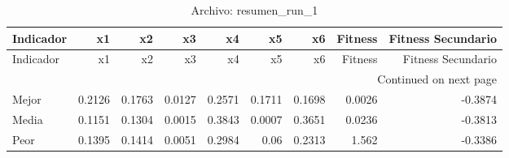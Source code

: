 \begin{longtable}{lrrrrrrrr}
\caption{Archivo: resumen\_run\_1}\label{tab:resumen_run_1} \\
\toprule
Indicador & x1 & x2 & x3 & x4 & x5 & x6 & Fitness & Fitness Secundario \\
\midrule
\endfirsthead
\toprule
Indicador & x1 & x2 & x3 & x4 & x5 & x6 & Fitness & Fitness Secundario \\
\midrule
\endhead
\midrule
\multicolumn{9}{r}{Continued on next page} \\
\midrule
\endfoot
\bottomrule
\endlastfoot
Mejor & 0.2126 & 0.1763 & 0.0127 & 0.2571 & 0.1711 & 0.1698 & 0.0026 & -0.3874 \\
Media & 0.1151 & 0.1304 & 0.0015 & 0.3843 & 0.0007 & 0.3651 & 0.0236 & -0.3813 \\
Peor & 0.1395 & 0.1414 & 0.0051 & 0.2984 & 0.06 & 0.2313 & 1.562 & -0.3386 \\
\end{longtable}
